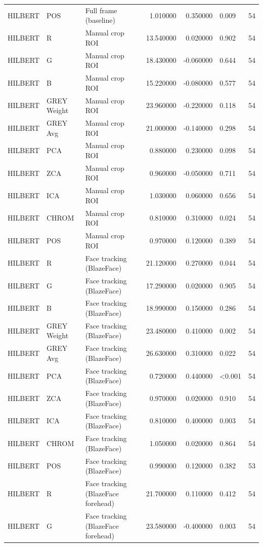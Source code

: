 \begin{table}[htbp]
\begin{tabular}{l l l r r l r}
HILBERT & POS & Full frame (baseline) & 1.010000 & 0.350000 & 0.009 & 54 \\
HILBERT & R & Manual crop ROI & 13.540000 & 0.020000 & 0.902 & 54 \\
HILBERT & G & Manual crop ROI & 18.430000 & -0.060000 & 0.644 & 54 \\
HILBERT & B & Manual crop ROI & 15.220000 & -0.080000 & 0.577 & 54 \\
HILBERT & GREY Weight & Manual crop ROI & 23.960000 & -0.220000 & 0.118 & 54 \\
HILBERT & GREY Avg & Manual crop ROI & 21.000000 & -0.140000 & 0.298 & 54 \\
HILBERT & PCA & Manual crop ROI & 0.880000 & 0.230000 & 0.098 & 54 \\
HILBERT & ZCA & Manual crop ROI & 0.960000 & -0.050000 & 0.711 & 54 \\
HILBERT & ICA & Manual crop ROI & 1.030000 & 0.060000 & 0.656 & 54 \\
HILBERT & CHROM & Manual crop ROI & 0.810000 & 0.310000 & 0.024 & 54 \\
HILBERT & POS & Manual crop ROI & 0.970000 & 0.120000 & 0.389 & 54 \\
HILBERT & R & Face tracking (BlazeFace) & 21.120000 & 0.270000 & 0.044 & 54 \\
HILBERT & G & Face tracking (BlazeFace) & 17.290000 & 0.020000 & 0.905 & 54 \\
HILBERT & B & Face tracking (BlazeFace) & 18.990000 & 0.150000 & 0.286 & 54 \\
HILBERT & GREY Weight & Face tracking (BlazeFace) & 23.480000 & 0.410000 & 0.002 & 54 \\
HILBERT & GREY Avg & Face tracking (BlazeFace) & 26.630000 & 0.310000 & 0.022 & 54 \\
HILBERT & PCA & Face tracking (BlazeFace) & 0.720000 & 0.440000 & <0.001 & 54 \\
HILBERT & ZCA & Face tracking (BlazeFace) & 0.970000 & 0.020000 & 0.910 & 54 \\
HILBERT & ICA & Face tracking (BlazeFace) & 0.810000 & 0.400000 & 0.003 & 54 \\
HILBERT & CHROM & Face tracking (BlazeFace) & 1.050000 & 0.020000 & 0.864 & 54 \\
HILBERT & POS & Face tracking (BlazeFace) & 0.990000 & 0.120000 & 0.382 & 53 \\
HILBERT & R & Face tracking (BlazeFace forehead) & 21.700000 & 0.110000 & 0.412 & 54 \\
HILBERT & G & Face tracking (BlazeFace forehead) & 23.580000 & -0.400000 & 0.003 & 54 \\

\end{tabular}
\end{table}
